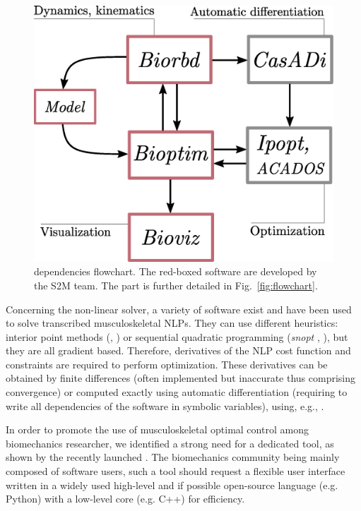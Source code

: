 \begin{figure}[t!]
\centering
\includegraphics[width=0.9\columnwidth]{figures/dependencies.eps}
\caption{\bioptim dependencies flowchart. The red-boxed software are developed by the S2M team. The \bioptim part is further detailed in Fig.~\ref{fig:flowchart}.}
\label{fig:dependencies}
\vspace*{-0.8cm}
\end{figure}

Concerning the non-linear solver, a variety of software exist and have been used to solve transcribed musculoskeletal NLPs.
They can use different heuristics: interior point methods (\ipopt, \cite{wachter2006implementation}) or sequential quadratic programming (\textit{snopt} \cite{gill2005snopt}, \acados \cite{verschueren2018towards}), but they are all gradient based.
Therefore, derivatives of the NLP cost function and constraints are required to perform optimization.
These derivatives can be obtained by finite differences (often implemented but inaccurate thus comprising convergence) or computed exactly using automatic differentiation (requiring to write all dependencies of the software in symbolic variables), using, e.g., \casadi \cite{andersson2019casadi}.

In order to promote the use of musculoskeletal optimal control among biomechanics researcher, we identified a strong need for a dedicated tool, as shown by the recently launched \moco \cite{dembia2020opensim}. 
The biomechanics community being mainly composed of software users, such a tool should request a flexible user interface written in a widely used high-level and if possible open-source language (e.g. Python) with a low-level core (e.g. C++) for efficiency. 


